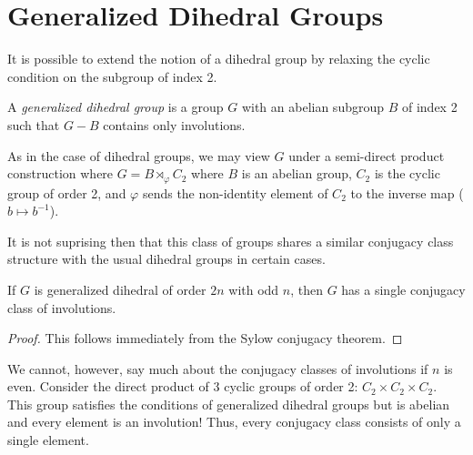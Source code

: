 \documentclass[main.tex]{subfiles}
\begin{document}
\hss

\section{Generalized Dihedral Groups}

\hss

It is possible to extend the notion of a dihedral group by relaxing the cyclic condition on the subgroup of index 2.

\hss

\begin{definition}
A \emph{generalized dihedral group} is a group $G$ with an abelian subgroup $B$ of index 2 such that $G - B$ contains only involutions.
\end{definition}

\hss

As in the case of dihedral groups, we may view $G$ under a semi-direct product construction where $G = B \rtimes_\varphi C_2$ where $B$ is an abelian group, $C_2$ is the cyclic group of order 2, and $\varphi$ sends the non-identity element of $C_2$ to the inverse map ($b \mapsto b^{-1}$). 

It is not suprising then that this class of groups shares a similar conjugacy class structure with the usual dihedral groups in certain cases.

\begin{proposition}\label{dihedralinvolutionclass}
If $G$ is generalized dihedral of order $2n$ with odd $n$, then $G$ has a single conjugacy class of involutions.
\end{proposition}

\begin{proof}
This follows immediately from the Sylow conjugacy theorem.
\end{proof}

We cannot, however, say much about the conjugacy classes of involutions if $n$ is even. Consider the direct product of 3 cyclic groups of order 2: $C_2 \times C_2 \times C_2$. This group satisfies the conditions of generalized dihedral groups but is abelian and every element is an involution! Thus, every conjugacy class consists of only a single element. 
\end{document}
